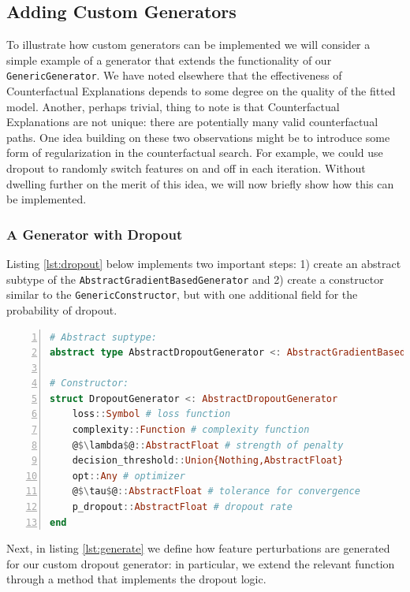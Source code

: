 \documentclass[
  letterpaper,
  DIV=11,
  numbers=noendperiod]{scrartcl}
\begin{document}
\hypertarget{sec-custom-gen}{%
\subsection{Adding Custom Generators}\label{sec-custom-gen}}

To illustrate how custom generators can be implemented we will consider
a simple example of a generator that extends the functionality of our
\texttt{GenericGenerator}. We have noted elsewhere that the
effectiveness of Counterfactual Explanations depends to some degree on
the quality of the fitted model. Another, perhaps trivial, thing to note
is that Counterfactual Explanations are not unique: there are
potentially many valid counterfactual paths. One idea building on these
two observations might be to introduce some form of regularization in
the counterfactual search. For example, we could use dropout to randomly
switch features on and off in each iteration. Without dwelling further
on the merit of this idea, we will now briefly show how this can be
implemented.

\hypertarget{a-generator-with-dropout}{%
\subsubsection{A Generator with
Dropout}\label{a-generator-with-dropout}}

Listing \ref{lst:dropout} below implements two important steps: 1)
create an abstract subtype of the
\texttt{AbstractGradientBasedGenerator} and 2) create a constructor
similar to the \texttt{GenericConstructor}, but with one additional
field for the probability of dropout.

\begin{lstlisting}[language=Julia, escapechar=@, numbers=left, label={lst:dropout}, caption={}]
# Abstract suptype:
abstract type AbstractDropoutGenerator <: AbstractGradientBasedGenerator end

# Constructor:
struct DropoutGenerator <: AbstractDropoutGenerator
    loss::Symbol # loss function
    complexity::Function # complexity function
    @$\lambda$@::AbstractFloat # strength of penalty
    decision_threshold::Union{Nothing,AbstractFloat} 
    opt::Any # optimizer
    @$\tau$@::AbstractFloat # tolerance for convergence
    p_dropout::AbstractFloat # dropout rate
end
\end{lstlisting}

Next, in listing \ref{lst:generate} we define how feature perturbations
are generated for our custom dropout generator: in particular, we extend
the relevant function through a method that implements the dropout
logic.
\end{document}
